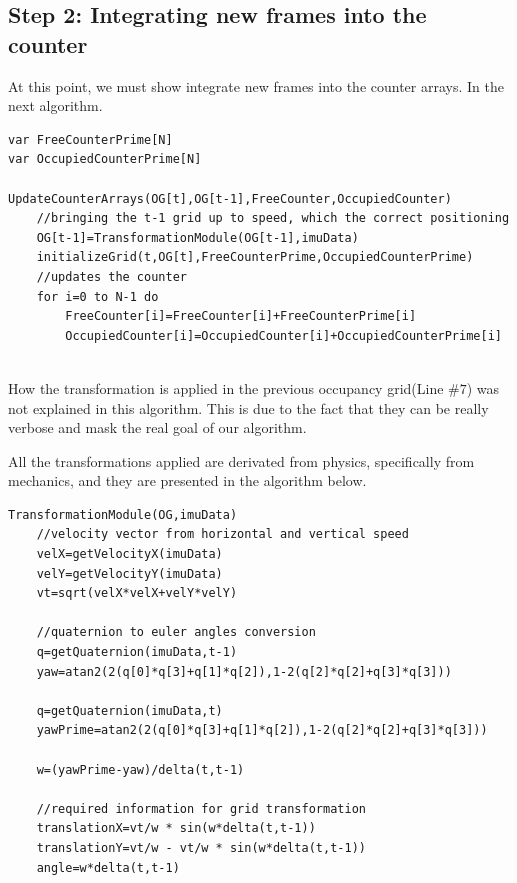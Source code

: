 \subsection{Step 2: Integrating new frames into the counter}

At this point, we must show integrate new frames into the counter arrays. In the next algorithm.

\begin{lstlisting}[title={Newframes},label=al:newframes,caption={Integrating new frames}]
var FreeCounterPrime[N]
var OccupiedCounterPrime[N]

UpdateCounterArrays(OG[t],OG[t-1],FreeCounter,OccupiedCounter)
	//bringing the t-1 grid up to speed, which the correct positioning
	OG[t-1]=TransformationModule(OG[t-1],imuData)
	initializeGrid(t,OG[t],FreeCounterPrime,OccupiedCounterPrime)
	//updates the counter
	for i=0 to N-1 do
		FreeCounter[i]=FreeCounter[i]+FreeCounterPrime[i]
		OccupiedCounter[i]=OccupiedCounter[i]+OccupiedCounterPrime[i]
	
\end{lstlisting}

How the transformation is applied in the previous occupancy grid(Line $\#7$) was not explained in this algorithm. This is due to the fact that they can be really verbose and mask the real goal of our algorithm. 

All the transformations applied are derivated from physics, specifically from mechanics, and they are presented in the algorithm below.

\begin{lstlisting}[title={Transformation},label=al:transformation,caption={Previous grid transformation}]
TransformationModule(OG,imuData)
	//velocity vector from horizontal and vertical speed	
	velX=getVelocityX(imuData)
	velY=getVelocityY(imuData)
	vt=sqrt(velX*velX+velY*velY)
	
	//quaternion to euler angles conversion	
	q=getQuaternion(imuData,t-1)
	yaw=atan2(2(q[0]*q[3]+q[1]*q[2]),1-2(q[2]*q[2]+q[3]*q[3]))	

	q=getQuaternion(imuData,t)
	yawPrime=atan2(2(q[0]*q[3]+q[1]*q[2]),1-2(q[2]*q[2]+q[3]*q[3]))	
	
	w=(yawPrime-yaw)/delta(t,t-1)
	
	//required information for grid transformation	
	translationX=vt/w * sin(w*delta(t,t-1))
	translationY=vt/w - vt/w * sin(w*delta(t,t-1))
	angle=w*delta(t,t-1)
		
\end{lstlisting}

